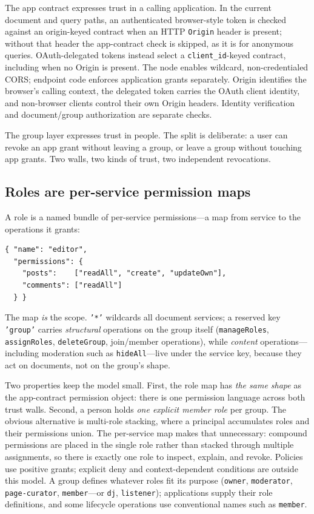 \documentclass[sigconf, nonacm]{acmart}
\begin{document}
The app contract expresses trust in a calling application. In the current
document and query paths, an authenticated browser-style token is checked
against an origin-keyed contract when an HTTP \texttt{Origin} header is
present; without that header the app-contract check is skipped, as it is for
anonymous queries. OAuth-delegated tokens instead select a
\texttt{client\_id}-keyed contract, including when no Origin is present. The
node enables wildcard, non-credentialed CORS; endpoint code enforces
application grants separately. Origin identifies the browser's calling
context, the delegated token carries the OAuth client identity, and
non-browser clients control their own Origin headers. Identity verification
and document/group authorization are separate checks.

The group layer expresses trust in people. The split is deliberate: a user
can revoke an app grant without leaving a group, or leave a group without
touching app grants. Two walls, two kinds of trust, two independent
revocations.

\subsection{Roles are per-service permission maps}

A role is a named bundle of per-service permissions---a map from service to
the operations it grants:

\begin{lstlisting}[style=json]
{ "name": "editor",
  "permissions": {
    "posts":    ["readAll", "create", "updateOwn"],
    "comments": ["readAll"]
  } }
\end{lstlisting}

The map \emph{is} the scope. \texttt{'*'} wildcards all document services; a
reserved key \texttt{'group'} carries \emph{structural} operations on the
group itself (\texttt{manageRoles}, \texttt{assignRoles},
\texttt{deleteGroup}, join/member operations), while \emph{content}
operations---including moderation such as \texttt{hideAll}---live under the
service key, because they act on documents, not on the group's shape.

Two properties keep the model small. First, the role map has \emph{the same
shape} as the app-contract permission object: there is one permission
language across both trust walls. Second, a person holds \emph{one explicit
member role} per group. The obvious alternative is multi-role stacking, where
a principal accumulates roles and their permissions union. The per-service
map makes that unnecessary: compound permissions are placed in the single
role rather than stacked through multiple assignments, so there is exactly
one role to inspect, explain, and revoke. Policies use positive grants;
explicit deny and context-dependent conditions are outside this model. A
group defines whatever roles fit its purpose (\texttt{owner},
\texttt{moderator}, \texttt{page-curator}, \texttt{member}---or
\texttt{dj}, \texttt{listener}); applications supply their role definitions,
and some lifecycle operations use conventional names such as \texttt{member}.
\end{document}
